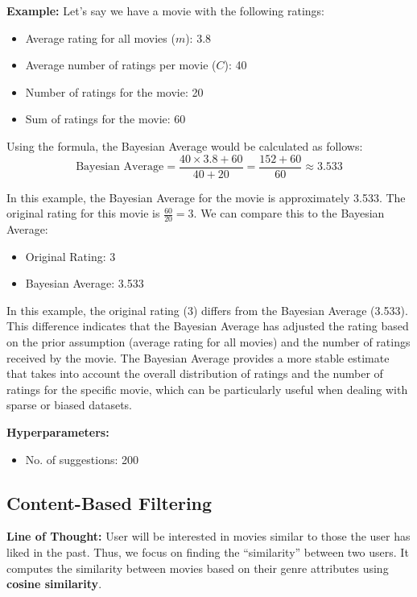 \documentclass[a4paper]{article}
\theoremstyle{plain}
\theoremstyle{definition}
\begin{document}
        \textbf{Example:} Let's say we have a movie with the following ratings:
        \begin{itemize}
            \item Average rating for all movies (\( m \)): 3.8
            \item Average number of ratings per movie (\( C \)): 40
            \item Number of ratings for the movie: 20
            \item Sum of ratings for the movie: 60
        \end{itemize}
        Using the formula, the Bayesian Average would be calculated as follows:
        \[
        \text{Bayesian Average} = \frac{{40 \times 3.8 + 60}}{{40 + 20}} = \frac{{152 + 60}}{{60}} \approx 3.533
        \]
        
        In this example, the Bayesian Average for the movie is approximately 3.533. The original rating for this movie is \( \frac{{60}}{{20}} = 3 \). We can compare this to the Bayesian Average:
        \begin{itemize}
            \item Original Rating: 3
            \item Bayesian Average: 3.533
        \end{itemize}
        In this example, the original rating (3) differs from the Bayesian Average (3.533). This difference indicates that the Bayesian Average has adjusted the rating based on the prior assumption (average rating for all movies) and the number of ratings received by the movie. The Bayesian Average provides a more stable estimate that takes into account the overall distribution of ratings and the number of ratings for the specific movie, which can be particularly useful when dealing with sparse or biased datasets.
        
        \textbf{Hyperparameters:} 
        \begin{itemize}
            \item No. of suggestions: 200
        \end{itemize}


    \subsection{Content-Based Filtering}

        \textbf{Line of Thought:} User will be interested in movies similar to those the user has liked in the past. Thus, we focus on finding the “similarity” between two users. It computes the similarity between movies based on their genre attributes using \textbf{cosine similarity}.\\
        
\end{document}
